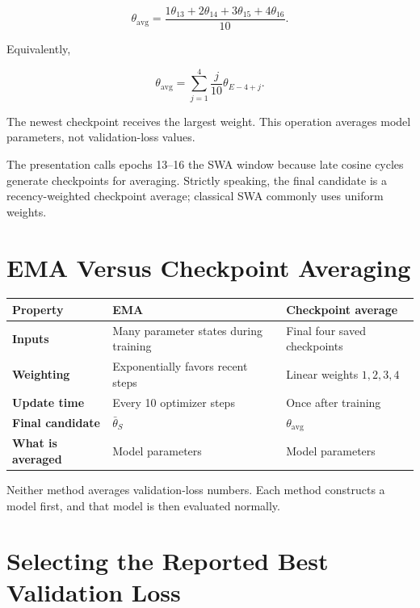\documentclass[11pt,a4paper]{article}
\begin{document}
\begin{equation}
  \theta_{\mathrm{avg}}
  =\frac{1\theta_{13}+2\theta_{14}+3\theta_{15}+4\theta_{16}}{10}.
\end{equation}

Equivalently,

\begin{equation}
  \theta_{\mathrm{avg}}
  =\sum_{j=1}^{4}\frac{j}{10}\theta_{E-4+j}.
\end{equation}

The newest checkpoint receives the largest weight. This operation averages
model parameters, not validation-loss values.

The presentation calls epochs 13--16 the SWA window because late cosine cycles
generate checkpoints for averaging. Strictly speaking, the final candidate is a
recency-weighted checkpoint average; classical SWA commonly uses uniform
weights.

\section{EMA Versus Checkpoint Averaging}

\begin{center}
\begin{tabularx}{\textwidth}{>{\bfseries}p{}XX}
  \toprule
  Property & EMA & Checkpoint average \\
  \midrule
  Inputs & Many parameter states during training & Final four saved checkpoints \\
  Weighting & Exponentially favors recent steps & Linear weights $1,2,3,4$ \\
  Update time & Every 10 optimizer steps & Once after training \\
  Final candidate & $\bar\theta_S$ & $\theta_{\mathrm{avg}}$ \\
  What is averaged & Model parameters & Model parameters \\
  \bottomrule
\end{tabularx}
\end{center}

Neither method averages validation-loss numbers. Each method constructs a model
first, and that model is then evaluated normally.

\section{Selecting the Reported Best Validation Loss}
\end{document}
